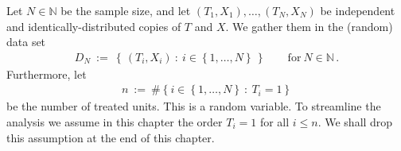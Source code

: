 Let  $N\in\mathbb{N}$ be the sample size, and let $(T_1,X_1),\ldots,(T_N,X_N)$ be independent and identically-distributed copies of $T$ and $X$. 
We gather them in the (random) data set 
\begin{gather*}
D_N
\ 
:=
\ 
\left\{\, (T_i,X_i)\ \colon\  i\in \left\{ 1,\ldots,N \right\}\, \right\}
\qquad
\text{for}\ N\in\mathbb{N}
\,.
\end{gather*}
Furthermore, let 
\begin{gather*}
  n
  \ 
  :=
  \ 
  \# 
  \left\{ 
    i\in \left\{ 1,\ldots,N \right\}
    \ 
    \colon
    \ 
    T_i=1
  \right\}
\end{gather*}
be the number of treated units. This is a random variable. 
To streamline the analysis we assume in this chapter the order $T_i=1$ for all $i\le n$.
We shall drop this assumption at the end of this chapter.
